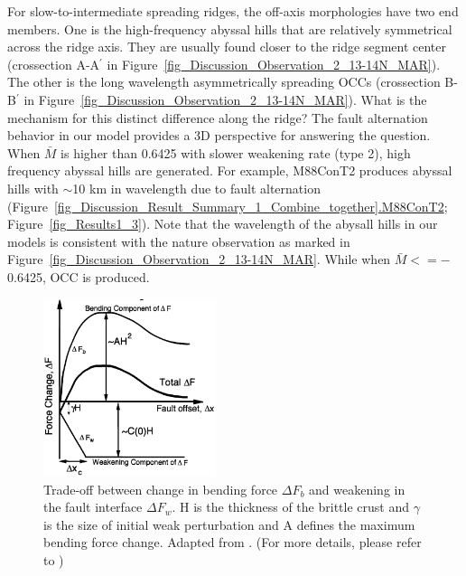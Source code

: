 For slow-to-intermediate spreading ridges, the off-axis morphologies have two end members. One is the high-frequency abyssal hills that are relatively symmetrical across the ridge axis. They are usually found closer to the ridge segment center (crossection A-A$^{\prime}$ in Figure~\hyperref[fig_Discussion_Observation_2_13-14N_MAR]{\ref{fig_Discussion_Observation_2_13-14N_MAR}}). The other is the long wavelength asymmetrically spreading OCCs (crossection B-B$^{\prime}$ in Figure~\hyperref[fig_Discussion_Observation_2_13-14N_MAR]{\ref{fig_Discussion_Observation_2_13-14N_MAR}}). What is the mechanism for this distinct difference along the ridge? The fault alternation behavior in our model provides a 3D perspective for answering the question. When $\bar{M}$ is higher than 0.6425 with slower weakening rate (type 2), high frequency abyssal hills are generated. For example, M88ConT2 produces abyssal hills with $\sim$10 km in wavelength due to fault alternation (Figure~\hyperref[fig_Discussion_Result_Summary_1_Combine_together]{\ref{fig_Discussion_Result_Summary_1_Combine_together}.M88ConT2}; Figure~\hyperref[fig_Results1_3]{\ref{fig_Results1_3}}). Note that the wavelength of the abysall hills in our models is consistent with the nature observation as marked in Figure~\hyperref[fig_Discussion_Observation_2_13-14N_MAR]{\ref{fig_Discussion_Observation_2_13-14N_MAR}}. While when $\bar{M} <=-$0.6425, OCC is produced.

\begin{figure}[h]
 \centering
  \includegraphics[width=0.45\textwidth]{./Figures/fig_Results_Weakening_1_tradeOff_bend_weak.png}
 \caption[Trade-off between change in bending force $\Delta F_{b}$ and weakening in the fault interface $\Delta F_{w}$. Adapted from \citep{Lavier2000}.]{Trade-off between change in bending force $\Delta F_{b}$ and weakening in the fault interface $\Delta F_{w}$. H is the thickness of the brittle crust and $\gamma$ is the size of initial weak perturbation and A defines the maximum bending force change. Adapted from \citep{Lavier2000}. (For more details, please refer to \citep{Lavier2000})}
 \label{fig_Results_Weakening_1}
\end{figure}

